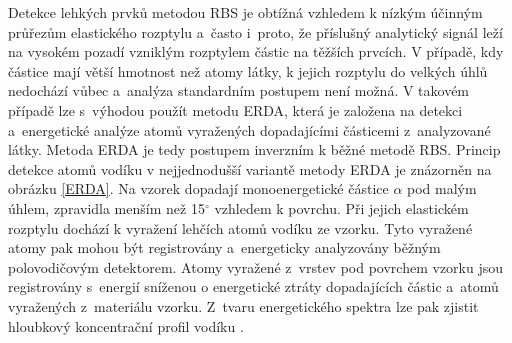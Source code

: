 Detekce lehkých prvků metodou RBS je obtížná vzhledem k nízkým účinným průřezům elastického rozptylu a~často i~proto, že příslušný analytický signál leží na vysokém pozadí vzniklým rozptylem částic na těžších prvcích. 
V případě, kdy částice mají větší hmotnost než atomy látky, k jejich rozptylu do velkých úhlů nedochází vůbec a~analýza standardním postupem není možná. V takovém případě lze s~výhodou použít metodu ERDA, která je založena na detekci a~energetické analýze atomů vyražených dopadajícími částicemi z~ana\-ly\-zované látky. 
Metoda ERDA je tedy postupem inverzním k běžné metodě RBS. Princip detekce atomů vodíku v nejjednodušší variantě metody ERDA je znázorněn na obrázku \ref{ERDA}. Na vzorek dopadají monoenergetické částice $\alpha$ pod malým úhlem, zpravidla menším než 15$^\circ$ vzhledem k povrchu. 
Při jejich elastickém rozptylu dochází k vyražení lehčích atomů vodíku ze vzorku. Tyto vyražené atomy pak mohou být registrovány a~energeticky analyzovány běžným polovodičovým detektorem. 
Atomy vyražené z~vrstev pod povrchem vzorku jsou registrovány s~energií sníženou o energetické ztráty dopadajících částic a~atomů vyražených z~materiálu vzorku. Z~tvaru energetického spektra lze pak zjistit hloubkový koncentrační profil vodíku \cite{Kral2002}. 

\cleardoublepage
